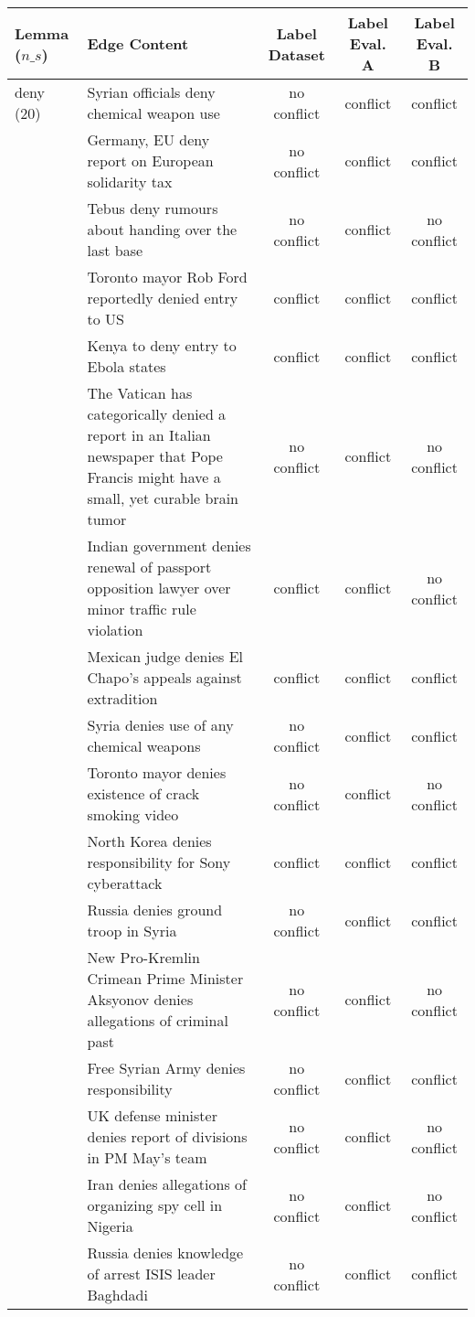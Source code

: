 \begin{sidewaystable}[ht]
\centering
\begin{tabular}{l p{13cm} ccc}
\toprule
Lemma (\(n\_s\)) & Edge Content & Label Dataset & Label Eval. A & Label Eval. B \\
\midrule
deny (20)
& Syrian officials deny chemical weapon use & no conflict & conflict & conflict \\
& Germany, EU deny report on European solidarity tax & no conflict & conflict & conflict \\
& Tebus deny rumours about handing over the last base & no conflict & conflict & no conflict \\
& Toronto mayor Rob Ford reportedly denied entry to US & conflict & conflict & conflict \\
& Kenya to deny entry to Ebola states & conflict & conflict & conflict \\
& The Vatican has categorically denied a report in an Italian newspaper that Pope Francis might have a small, yet curable brain tumor & no conflict & conflict & no conflict \\
& Indian government denies renewal of passport opposition lawyer over minor traffic rule violation & conflict & conflict & no conflict \\
& Mexican judge denies El Chapo's appeals against extradition & conflict & conflict & conflict \\
& Syria denies use of any chemical weapons & no conflict & conflict & conflict \\
& Toronto mayor denies existence of crack smoking video & no conflict & conflict & no conflict \\
& North Korea denies responsibility for Sony cyberattack & conflict & conflict & conflict \\
& Russia denies ground troop in Syria & no conflict & conflict & conflict \\
& New Pro-Kremlin Crimean Prime Minister Aksyonov denies allegations of criminal past & no conflict & conflict & no conflict \\
& Free Syrian Army denies responsibility & no conflict & conflict & conflict \\
& UK defense minister denies report of divisions in PM May's team & no conflict & conflict & no conflict \\
& Iran denies allegations of organizing spy cell in Nigeria & no conflict & conflict & no conflict \\
& Russia denies knowledge of arrest ISIS leader Baghdadi & no conflict & conflict & conflict \\

\end{tabular}
\end{sidewaystable}
